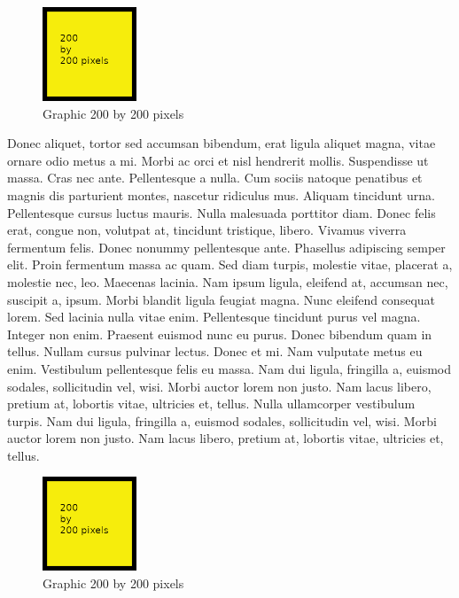 \begin{figure}
\centering
\includegraphics[width=0.25\textwidth]{200x200}
\caption{Graphic 200 by 200 pixels}\label{fg:200x200-5}
\end{figure}
Donec aliquet, tortor sed accumsan bibendum, erat ligula aliquet magna, vitae ornare odio metus a mi. Morbi ac orci et nisl hendrerit mollis. Suspendisse ut massa. Cras nec ante. Pellentesque a nulla. Cum sociis natoque penatibus et magnis dis parturient montes, nascetur ridiculus mus. Aliquam tincidunt urna. Pellentesque cursus luctus mauris.  Nulla malesuada porttitor diam. Donec felis erat, congue non, volutpat at, tincidunt tristique, libero. Vivamus viverra fermentum felis. Donec nonummy pellentesque ante. Phasellus adipiscing semper elit. Proin fermentum massa ac quam. Sed diam turpis, molestie vitae, placerat a, molestie nec, leo. Maecenas lacinia. Nam ipsum ligula, eleifend at, accumsan nec, suscipit a, ipsum. Morbi blandit ligula feugiat magna. Nunc eleifend consequat lorem. Sed lacinia nulla vitae enim. Pellentesque tincidunt purus vel magna. Integer non enim. Praesent euismod nunc eu purus. Donec bibendum quam in tellus. Nullam cursus pulvinar lectus. Donec et mi. Nam vulputate metus eu enim. Vestibulum pellentesque felis eu massa. Nam dui ligula, fringilla a, euismod sodales, sollicitudin vel, wisi. Morbi auctor lorem non justo. Nam lacus libero, pretium at, lobortis vitae, ultricies et, tellus.   Nulla ullamcorper vestibulum turpis. Nam dui ligula, fringilla a, euismod sodales, sollicitudin vel, wisi. Morbi auctor lorem non justo. Nam lacus libero, pretium at, lobortis vitae, ultricies et, tellus.
\begin{figure}
\begin{center}
\includegraphics[width=0.25\textwidth]{200x200}
\caption{Graphic 200 by 200 pixels}\label{fg:200x200-6}
\end{center}
\end{figure}

